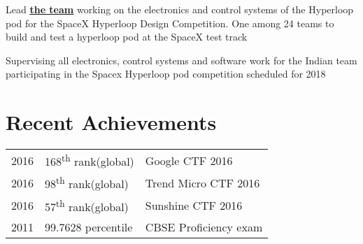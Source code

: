 \documentclass[]{illustris-resume-openfont}
\newcommand{\myul}[2][black]{\setulcolor{#1}\ul{#2}\setulcolor{black}}
\begin{document}
\begin{minipage}[t]{0.66\textwidth}
Lead \textbf{\href{https://www.facebook.com/teamhyperloopindia}{\color{blue} \myul[blue] {the team}}} working on the electronics and control systems of the Hyperloop pod for the SpaceX Hyperloop Design Competition. One among 24 teams to build and test a hyperloop pod at the SpaceX test track
\sectionsep

Supervising all electronics, control systems and software work for the Indian team participating in the Spacex Hyperloop pod competition scheduled for 2018



\section{Recent Achievements} 
\begin{tabular}{rll}

2016    & 168\textsuperscript{th} rank(global)    & Google CTF 2016 \\
2016    & 98\textsuperscript{th} rank(global) & Trend Micro CTF 2016 \\
2016    & 57\textsuperscript{th} rank(global) & Sunshine CTF 2016 \\
2011    & 99.7628 percentile  & CBSE Proficiency exam \\

\end{tabular}



\end{minipage}
\end{document}
